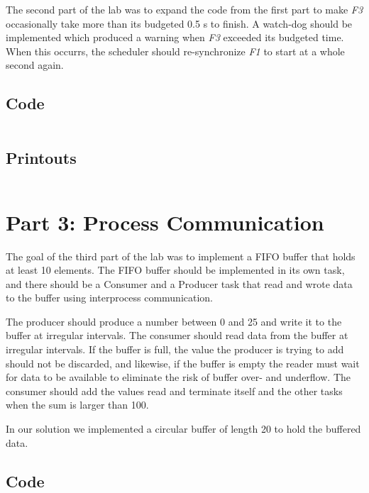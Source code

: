 \documentclass[a4paper,10pt]{article}
\begin{document}
The second part of the lab was to expand the code from the first part to make \emph{F3} occasionally take more than its budgeted 0.5 s to finish. A watch-dog should be implemented which produced a warning when \emph{F3} exceeded its budgeted time. When this occurrs, the scheduler should re-synchronize \emph{F1} to start at a whole second again.

\subsection{Code}

\begin{lstlisting}

\end{lstlisting}

\subsection{Printouts}

\begin{lstlisting}[language=Bash]

\end{lstlisting}

\section{Part 3: Process Communication}

The goal of the third part of the lab was to implement a FIFO buffer that holds at least 10 elements. The FIFO buffer should be implemented in its own task, and there should be a Consumer and a Producer task that read and wrote data to the buffer using interprocess communication.

The producer should produce a number between 0 and 25 and write it to the buffer at irregular intervals. The consumer should read data from the buffer at irregular intervals. If the buffer is full, the value the producer is trying to add should not be discarded, and likewise, if the buffer is empty the reader must wait for data to be available to eliminate the risk of buffer over- and underflow. The consumer should add the values read and terminate itself and the other tasks when the sum is larger than 100.

In our solution we implemented a circular buffer of length 20 to hold the buffered data.

\subsection{Code}
\end{document}
